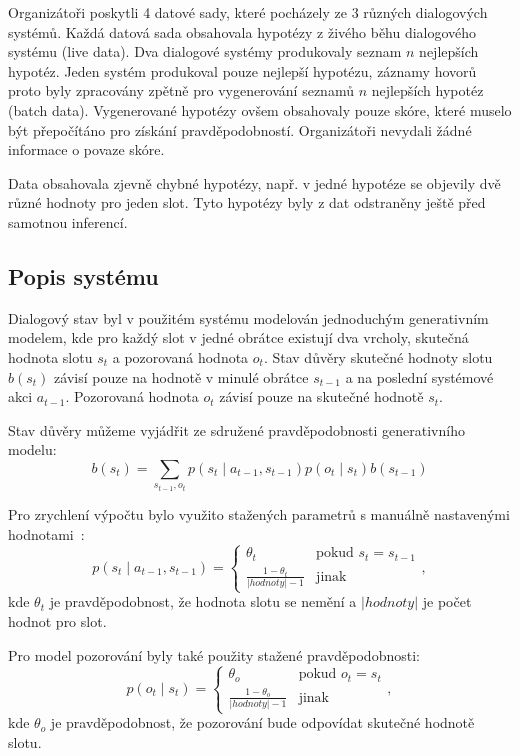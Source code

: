 Organizátoři poskytli 4 datové sady, které pocházely ze 3 různých dialogových systémů.
Každá datová sada obsahovala hypotézy z živého běhu dialogového systému (live data).
Dva dialogové systémy produkovaly seznam $n$ nejlepších hypotéz.
Jeden systém produkoval pouze nejlepší hypotézu, záznamy hovorů proto byly zpracovány zpětně pro vygenerování seznamů $n$ nejlepších hypotéz (batch data).
Vygenerované hypotézy ovšem obsahovaly pouze skóre, které muselo být přepočítáno pro získání pravděpodobností.
Organizátoři nevydali žádné informace o povaze skóre.

Data obsahovala zjevně chybné hypotézy, např. v jedné hypotéze se objevily dvě různé hodnoty pro jeden slot.
Tyto hypotézy byly z dat odstraněny ještě před samotnou inferencí.

\subsection{Popis systému}

Dialogový stav byl v použitém systému modelován jednoduchým generativním modelem, kde pro každý slot v jedné obrátce existují dva vrcholy, skutečná hodnota slotu $s_t$ a pozorovaná hodnota $o_t$.
Stav důvěry skutečné hodnoty slotu $b(s_t)$ závisí pouze na hodnotě v minulé obrátce $s_{t-1}$ a na poslední systémové akci $a_{t-1}$.
Pozorovaná hodnota $o_t$ závisí pouze na skutečné hodnotě $s_t$.

Stav důvěry můžeme vyjádřit ze sdružené pravděpodobnosti generativního modelu:
\begin{equation}
b(s_t) = \sum_{s_{t-1}, o_t} p(s_t \mid a_{t-1}, s_{t-1}) p(o_t \mid s_t) b(s_{t-1})
\end{equation}

Pro zrychlení výpočtu bylo využito stažených parametrů s manuálně nastavenými hodnotami~\cite{thomson2010bayesian}:
\begin{equation}
p(s_t \mid a_{t-1}, s_{t-1}) = \begin{cases}
\theta_t & \text{pokud } s_t = s_{t-1} \\
\frac{1 - \theta_t}{|hodnoty| - 1} & \text{jinak}
\end{cases},
\end{equation}
kde $\theta_t$ je pravděpodobnost, že hodnota slotu se nemění a $|hodnoty|$ je počet hodnot pro slot.

Pro model pozorování byly také použity stažené pravděpodobnosti:
\begin{equation}
p(o_t \mid s_t) = \begin{cases}
\theta_o & \text{pokud } o_t = s_t \\
\frac{1 - \theta_o}{|hodnoty| - 1} & \text{jinak}
\end{cases},
\end{equation}
kde $\theta_o$ je pravděpodobnost, že pozorování bude odpovídat skutečné hodnotě slotu.

